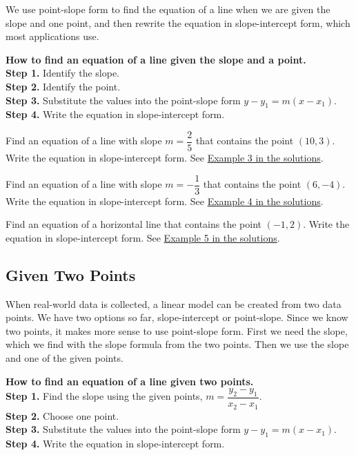 \documentclass[letter]{article}
\newenvironment{keybox}
  {\begin{lrbox}{\keyboxsave}\begin{minipage}{\dimexpr\linewidth-2\fboxsep-2\fboxrule\relax}}
  {\end{minipage}\end{lrbox}\par\noindent\fbox{\usebox{\keyboxsave}}\par}
\newcommand{\exbox}[1]{\fbox{\textbf{Example #1}}}
\newcommand{\chp}{}
\newcommand{\seesol}[1]{See \hyperref[sec:\chp ex#1]{Example #1 in the solutions}.}
\begin{document}
We use point-slope form to find the equation of a line when we are given the slope and one point, and then rewrite the equation in slope-intercept form, which most applications use.

\begin{keybox}
\textbf{How to find an equation of a line given the slope and a point.}\\
\textbf{Step 1.} Identify the slope.\\
\textbf{Step 2.} Identify the point.\\
\textbf{Step 3.} Substitute the values into the point-slope form $y-y_1=m(x-x_1)$.\\
\textbf{Step 4.} Write the equation in slope-intercept form.
\end{keybox}

\exbox{3} Find an equation of a line with slope $m=\dfrac25$ that contains the point $(10,3)$. Write the equation in slope-intercept form. \seesol{3}

\exbox{4} Find an equation of a line with slope $m=-\dfrac13$ that contains the point $(6,-4)$. Write the equation in slope-intercept form. \seesol{4}

\exbox{5} Find an equation of a horizontal line that contains the point $(-1,2)$. Write the equation in slope-intercept form. \seesol{5}

\subsection{Given Two Points}

When real-world data is collected, a linear model can be created from two data points. We have two options so far, slope-intercept or point-slope. Since we know two points, it makes more sense to use point-slope form. First we need the slope, which we find with the slope formula from the two points. Then we use the slope and one of the given points.

\begin{keybox}
\textbf{How to find an equation of a line given two points.}\\
\textbf{Step 1.} Find the slope using the given points, $m=\dfrac{y_2-y_1}{x_2-x_1}$.\\
\textbf{Step 2.} Choose one point.\\
\textbf{Step 3.} Substitute the values into the point-slope form $y-y_1=m(x-x_1)$.\\
\textbf{Step 4.} Write the equation in slope-intercept form.
\end{keybox}
\end{document}
